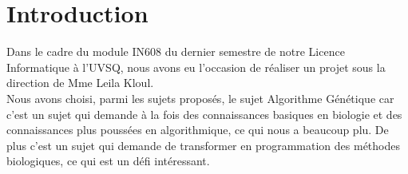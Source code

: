 \documentclass[a4paper,11pt]{article}
\title{\vspace{13em}{\huge Rapport Final}}
\author{Edouard Fouassier - Maxime Gonthier - Benjamin Guillot\\
		Laureline Martin - Rémi Navarro - Lydia Rodrigez de la Nava
		\vspace{2em}\\
		Algorithme Génétique
		\vspace{2em}}
\begin{document}
	
	\clearpage
	\maketitle\vspace{13em}
\newpage
\tableofcontents
\newpage\clearpage{}

	\section{Introduction}
		Dans le cadre du module IN608 du dernier semestre de notre Licence Informatique à l’UVSQ, nous avons eu l’occasion de réaliser un projet sous la direction de Mme Leila Kloul.\\
		Nous avons choisi, parmi les sujets proposés, le sujet Algorithme Génétique car c’est un sujet qui demande à la fois des connaissances basiques en biologie et des connaissances plus poussées en algorithmique, ce qui nous a beaucoup plu.
		De plus c’est un sujet qui demande de transformer en programmation des méthodes biologiques, ce qui est un défi intéressant.\\
		
\end{document}
